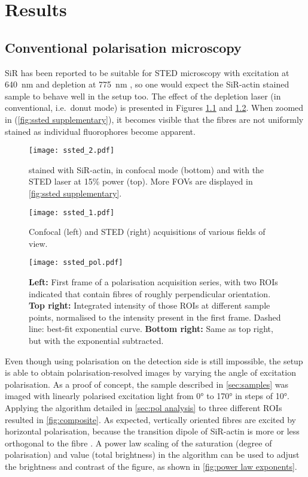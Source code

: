 \chapter{Results}

\section{Conventional polarisation microscopy}
\label{sec:conventional pol}

SiR has been reported to be suitable for STED microscopy with excitation at 640~nm and depletion at 775~nm \cite{DEste2015}, so one would expect the SiR-actin stained sample to behave well in the setup too. The effect of the depletion laser (in conventional, i.e.~donut mode) is presented in Figures \ref{fig:ssted} and \ref{fig:ssted supplementary}. When zoomed in (\autoref{fig:ssted supplementary}), it becomes visible that the fibres are not uniformly stained as individual fluorophores become apparent.

\begin{figure}
	\centering
	\texttt{[image: ssted\_2.pdf]}
	\caption{
	 stained with SiR-actin, in confocal mode (bottom) and with the STED laser at 15\% power (top). More FOVs are displayed in \autoref{fig:ssted supplementary}.
	}
	\label{fig:ssted}
\end{figure}



\begin{figure}
	\centering
	\texttt{[image: ssted\_1.pdf]}
	\caption{
		Confocal (left) and STED (right) acquisitions of various fields of view.
	}
	\label{fig:ssted supplementary}
\end{figure}


\begin{figure}
	\centering
	\texttt{[image: ssted\_pol.pdf]}
	\caption{
		\textbf{Left:} First frame of a polarisation acquisition series, with two ROIs indicated that contain fibres of roughly perpendicular orientation. \textbf{Top right:} Integrated intensity of those ROIs at different sample points, normalised to the intensity present in the first frame. Dashed line: best-fit exponential curve. \textbf{Bottom right:} Same as top right, but with the exponential subtracted.
	}
	\label{fig:ssted pol}
\end{figure}

Even though using polarisation on the detection side is still impossible, the setup is able to obtain polarisation-resolved images by varying the angle of excitation polarisation. As a proof of concept, the sample described in \autoref{sec:samples} was imaged with linearly polarised excitation light from \ang{0} to \ang{170} in steps of \ang{10}. Applying the algorithm detailed in \autoref{sec:pol analysis} to three different ROIs resulted in \autoref{fig:composite}. As expected, vertically oriented fibres are excited by horizontal polarisation, because the transition dipole of SiR-actin is more or less orthogonal to the fibre \cite{Spira2017}.
A power law scaling of the saturation (degree of polarisation) and value (total brightness) in the algorithm can be used to adjust the brightness and contrast of the figure, as shown in \autoref{fig:power law exponents}.

